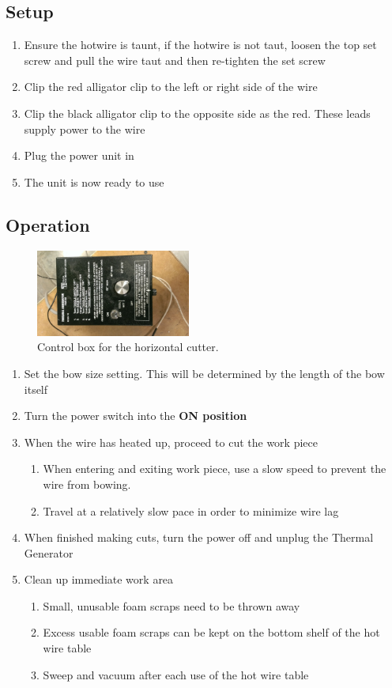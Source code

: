 \subsection{Setup}
\begin{enumerate}
\item Ensure the hotwire is taunt, if the hotwire is not taut, loosen the top set screw and pull the wire taut and then re-tighten the set screw
\item Clip the red alligator clip to the left or right side of the wire 
\item Clip the black alligator clip to the opposite side as the red. These leads supply power to the wire
\item Plug the power unit in
\item The unit is now ready to use
\end{enumerate}
\subsection{Operation}

\begin{figure}[ht]
\centering
\includegraphics[angle = 270, trim = 150mm 50mm 250mm 50mm,clip,width=2in]{images/IMAG0216}
\caption{Control box for the horizontal cutter.}
\label{fig:controlbox}
\end{figure}

\begin{enumerate}
\item Set the bow size setting. This will be determined by the length of the bow itself
\item Turn the power switch into the \textbf{ON position}
\item When the wire has heated up, proceed to cut the work piece
\begin{enumerate}
\item When entering and exiting work piece, use a slow speed to prevent the wire from bowing.
\item Travel at a relatively slow pace in order to minimize wire lag
\end{enumerate}
\item When finished making cuts, turn the power off and unplug the Thermal Generator
\item Clean up immediate work area
\begin{enumerate}
\item Small, unusable foam scraps need to be thrown away
\item Excess usable foam scraps can be kept on the bottom shelf of the hot wire table
\item Sweep and vacuum after each use of the hot wire table
\end{enumerate}
\end{enumerate}

